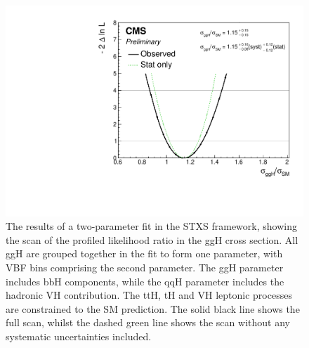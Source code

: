 \begin{figure}[hptb]
  \centering
  \includegraphics[width=\textwidth]{Figures/Results/ObsStage0_r_ggH.pdf}
  \caption[Likelihood scan for the ggH parameter in a two-parameter fit.]
  {
    The results of a two-parameter fit in the STXS framework,
    showing the scan of the profiled likelihood ratio in the ggH cross section.
    All ggH are grouped together in the fit to form one parameter, 
    with VBF bins comprising the second parameter.
    The ggH parameter includes bbH components, 
    while the qqH parameter includes the hadronic VH contribution. 
    The ttH, tH and VH leptonic processes are constrained to the SM prediction. 
    The solid black line shows the full scan, 
    whilst the dashed green line shows the scan without any systematic uncertainties included.
  }
  \label{fig:results_Stage0_ggH}
\end{figure}

